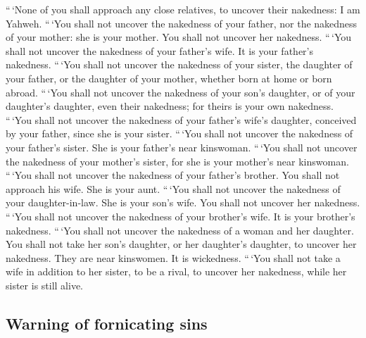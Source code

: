  ``\,`None of you shall approach any close relatives, to
uncover their nakedness: I am Yahweh.  ``\,`You shall not
uncover the nakedness of your father, nor the nakedness of your mother:
she is your mother. You shall not uncover her nakedness. 
``\,`You shall not uncover the nakedness of your father's wife. It is
your father's nakedness.  ``\,`You shall not uncover the
nakedness of your sister, the daughter of your father, or the daughter
of your mother, whether born at home or born abroad. 
``\,`You shall not uncover the nakedness of your son's daughter, or of
your daughter's daughter, even their nakedness; for theirs is your own
nakedness.  ``\,`You shall not uncover the nakedness of
your father's wife's daughter, conceived by your father, since she is
your sister.  ``\,`You shall not uncover the nakedness of
your father's sister. She is your father's near kinswoman.
 ``\,`You shall not uncover the nakedness of your
mother's sister, for she is your mother's near kinswoman.
 ``\,`You shall not uncover the nakedness of your
father's brother. You shall not approach his wife. She is your aunt.
 ``\,`You shall not uncover the nakedness of your
daughter-in-law. She is your son's wife. You shall not uncover her
nakedness.  ``\,`You shall not uncover the nakedness of
your brother's wife. It is your brother's nakedness. 
``\,`You shall not uncover the nakedness of a woman and her daughter.
You shall not take her son's daughter, or her daughter's daughter, to
uncover her nakedness. They are near kinswomen. It is wickedness.
 ``\,`You shall not take a wife in addition to her
sister, to be a rival, to uncover her nakedness, while her sister is
still alive.

\hypertarget{warning-of-fornicating-sins}{%
\subsection{Warning of fornicating
sins}\label{warning-of-fornicating-sins}}

